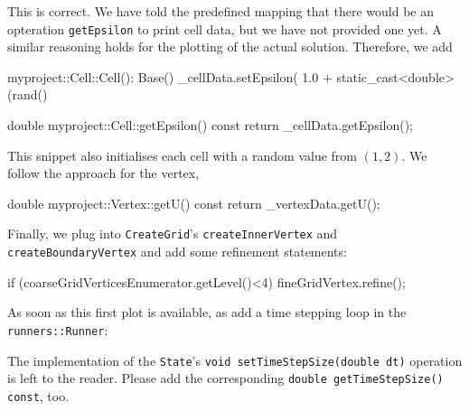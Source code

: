 \noindent
This is correct. 
We have told the predefined mapping that there would be an opteration
\texttt{getEpsilon} to print cell data, but we have not provided one yet.
A similar reasoning holds for the plotting of the actual solution.
Therefore, we add 

\begin{code}
myproject::Cell::Cell():
  Base() { 
  _cellData.setEpsilon( 1.0 + static_cast<double>(rand() %
}

double myproject::Cell::getEpsilon() const {
  return _cellData.getEpsilon();
}
\end{code}

\noindent
This snippet also initialises each cell with a random value from $(1,2)$.
We follow the approach for the vertex,

\begin{code}
double myproject::Vertex::getU() const {
  return _vertexData.getU();
}
\end{code}

\noindent
Finally, we plug into \texttt{CreateGrid}'s \texttt{createInnerVertex} and
\texttt{createBoundaryVertex} and add some refinement statements:

\begin{code}
  if (coarseGridVerticesEnumerator.getLevel()<4) {
    fineGridVertex.refine();
  }
\end{code}

As soon as this first plot is available, as add a time stepping loop in the
\texttt{runners::Runner}:


\noindent
The implementation of the \texttt{State}'s \texttt{void setTimeStepSize(double
dt)} operation is left to the reader. 
Please add the corresponding \texttt{double getTimeStepSize() const}, too.


